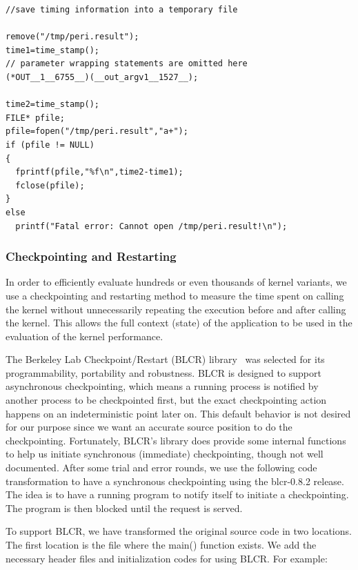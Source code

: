 {\mySmallFontSize
\begin{verbatim}
//save timing information into a temporary file

remove("/tmp/peri.result");
time1=time_stamp();
// parameter wrapping statements are omitted here
(*OUT__1__6755__)(__out_argv1__1527__);

time2=time_stamp();
FILE* pfile;
pfile=fopen("/tmp/peri.result","a+");
if (pfile != NULL)
{
  fprintf(pfile,"%f\n",time2-time1);
  fclose(pfile);
}
else
  printf("Fatal error: Cannot open /tmp/peri.result!\n");

\end{verbatim}
}

\subsubsection{Checkpointing and Restarting}
In order to efficiently evaluate hundreds or even thousands of kernel
variants, we use a checkpointing and restarting method to measure the time
spent on calling the kernel without unnecessarily repeating the execution
before and after calling the kernel.  This allows the full context (state) 
of the application to be used in the evaluation of the kernel performance.

The Berkeley Lab Checkpoint/Restart (BLCR) library~\cite{blcrWeb} was selected for its
programmability, portability and robustness. 
BLCR is designed to support asynchronous checkpointing, which means a running process
is notified by another process to be checkpointed first, but the exact checkpointing
action happens on an indeterministic point later on. 
This default behavior is not desired for our purpose since we want an
accurate source position to do the checkpointing. 
Fortunately, BLCR's library does provide some internal functions to help
us initiate synchronous (immediate) checkpointing, though not well documented. 
After some trial and error rounds, we use the following code transformation
to have a synchronous checkpointing using the blcr-0.8.2 release.
The idea is to have a running program to notify itself to initiate a checkpointing. 
The program is then blocked until the request is served. 

To support BLCR, we have transformed the original source code in two locations.
The first location is the file where the main() function exists. We add the necessary
header files and initialization codes for using BLCR.  For example:


